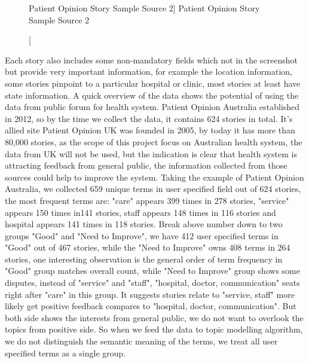 \documentclass[11pt,twoside]{report}
\begin{document}
\begin{figure}[h]
    \begin{center}
    \caption
    [Patient Opinion Story Sample Source 2]
    {
    Patient Opinion Story Sample Source 2
    \label{Figure3}
    }
    \end{center}
\end{figure}
Each story also includes some non-mandatory fields which not in the screenshot but provide very important information, for example the location information, some stories pinpoint to a particular hospital or clinic, most stories at least have state information. A quick overview of the data shows the potential of using the data from public forum for health system. Patient Opinion Australia established in 2012, so by the time we collect the data, it contains 624 stories in total. It's allied site Patient Opinion UK was founded in 2005, by today it has more than 80,000 stories, as the scope of this project focus on Australian health system, the data from UK will not be used, but the indication is clear that health system is attracting feedback from general public, the information collected from those sources could help to improve the system. Taking the example of Patient Opinion Australia, we collected 659 unique terms in user specified field out of 624 stories, the most frequent terms are: "care" appears 399 times in 278 stories, "service" appears 150 times in141 stories, staff appears 148 times in 116 stories and hospital appears 141 times in 118 stories. Break above number down to two groups "Good" and "Need to Improve", we have 412 user specified terms in "Good" out of 467 stories, while the "Need to Improve" owns 408 terms in 264 stories, one interesting observation is the general order of term frequency in "Good" group matches overall count, while "Need to Improve" group shows some disputes, instead of "service" and "staff", "hospital, doctor, communication" seats right after "care" in this group. It suggests stories relate to "service, staff" more likely get positive feedback compares to "hospital, doctor, communication". But both side shows the interests from general public, we do not want to overlook the topics from positive side. So when we feed the data to topic modelling algorithm, we do not distinguish the semantic meaning of the terms, we treat all user specified terms as a single group. 
\end{document}

